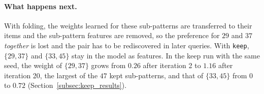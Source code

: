 \paragraph{What happens next.}
With folding, the weights learned for these sub-patterns are transferred to their items and the sub-pattern
features are removed, so the preference for $29$ and $37$ \emph{together} is lost and the pair has to be
rediscovered in later queries. With \texttt{keep}, $\{29, 37\}$ and $\{33, 45\}$ stay in the model as features.
In the keep run with the same seed, the weight of $\{29, 37\}$ grows from $0.26$ after iteration 2 to $1.16$
after iteration 20, the largest of the $47$ kept sub-patterns, and that of $\{33, 45\}$ from $0$ to $0.72$
(Section~\ref{subsec:keep_results}).

